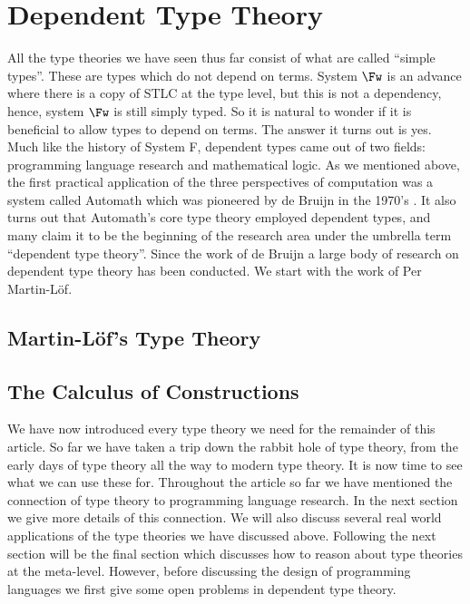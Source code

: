 \section{Dependent Type Theory}
\label{sec:dependent_type_theory}
All the type theories we have seen thus far consist of what are called
``simple types''.  These are types which do not depend on terms.
System $\Fw$ is an advance where there is a copy of STLC at the type
level, but this is not a dependency, hence, system $\Fw$ is still
simply typed.  So it is natural to wonder if it is beneficial to allow
types to depend on terms.  The answer it turns out is yes. Much like
the history of System F, dependent types came out of two fields:
programming language research and mathematical logic.  As we mentioned
above, the first practical application of the three perspectives of
computation was a system called Automath which was pioneered by de
Bruijn in the 1970's \cite{DeBruijn:1970}.  It also turns out that
Automath's core type theory employed dependent types, and many claim
it to be the beginning of the research area under the umbrella term
``dependent type theory''.  Since the work of de Bruijn a large body of
research on dependent type theory has been conducted.  We start with
the work of Per Martin-L\"of.

\subsection{Martin-L\"of's Type Theory}
\label{subsec:martin-lofs_type_theory}


\subsection{The Calculus of Constructions}
\label{subsec:the_calculus_of_constructions}




We have now introduced every type theory we need for the remainder of
this article.  So far we have taken a trip down the rabbit hole of
type theory,  from the early days of type theory all the way to modern
type theory.  It is now time to see what we can use these for.
Throughout the article so far we have mentioned the connection of type
theory to programming language research.  In the next section we give
more details of this connection.  We will also discuss several real
world applications of the type theories we have discussed above.
Following the next section will be the final section which discusses
how to reason about type theories at the meta-level.  However, before
discussing the design of programming languages we first give some open
problems in dependent type theory.

